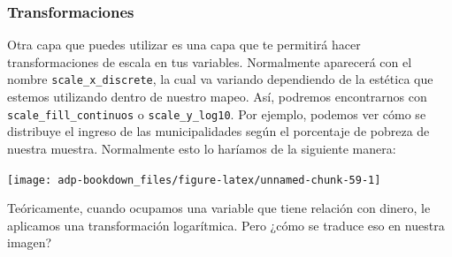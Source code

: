 \documentclass[]{book}
\newenvironment{Shaded}{\begin{snugshade}}{\end{snugshade}}
\newcommand{\DataTypeTok}[1]{\textcolor[rgb]{0.13,0.29,0.53}{#1}}
\newcommand{\DecValTok}[1]{\textcolor[rgb]{0.00,0.00,0.81}{#1}}
\newcommand{\KeywordTok}[1]{\textcolor[rgb]{0.13,0.29,0.53}{\textbf{#1}}}
\newcommand{\NormalTok}[1]{#1}
\newcommand{\OperatorTok}[1]{\textcolor[rgb]{0.81,0.36,0.00}{\textbf{#1}}}
\newcommand{\StringTok}[1]{\textcolor[rgb]{0.31,0.60,0.02}{#1}}
\begin{document}
\hypertarget{transformaciones}{%
\subsubsection{Transformaciones}\label{transformaciones}}

Otra capa que puedes utilizar es una capa que te permitirá hacer
transformaciones de escala en tus variables. Normalmente aparecerá con
el nombre \texttt{scale\_x\_discrete}, la cual va variando dependiendo
de la estética que estemos utilizando dentro de nuestro mapeo. Así,
podremos encontrarnos con \texttt{scale\_fill\_continuos} o
\texttt{scale\_y\_log10}. Por ejemplo, podemos ver cómo se distribuye el
ingreso de las municipalidades según el porcentaje de pobreza de nuestra
muestra. Normalmente esto lo haríamos de la siguiente manera:

\begin{Shaded}
\end{Shaded}

\begin{center}\texttt{[image: adp-bookdown\_files/figure-latex/unnamed-chunk-59-1]} \end{center}

Teóricamente, cuando ocupamos una variable que tiene relación con
dinero, le aplicamos una transformación logarítmica. Pero ¿cómo se
traduce eso en nuestra imagen?

\begin{Shaded}
\end{Shaded}
\end{document}
